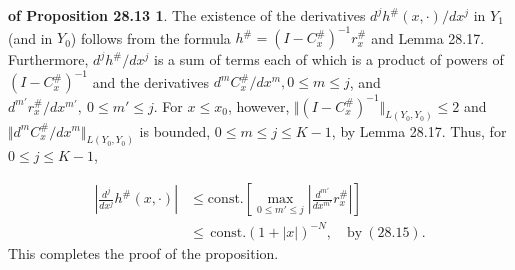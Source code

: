 \documentclass{surv-l}
\theoremstyle{plain}
\theoremstyle{definition}
\newtheorem*{pop2813}{\sc{Proof} of Proposition 28.13}
\numberwithin{equation}{chapter}
\begin{document}
\begin{pop2813}\label{pop28.13} The existence of the derivatives $d^{j}h^{\#}(x, \cdot)/dx^{j}$ in $Y_{1}$ (and in $Y_{0}$) follows from the formula $h^{\#} =(I-C_{x}^{\#})^{-1}r_{x}^{\#}$ and Lemma 28.17. Furthermore, $d^{j}h^{\#}/dx^{j}$ is a sum of terms each of which is a product of powers of $(I -C_{x}^{\#})^{-1}$ and the derivatives $d^{m}C_{x}^{\#}/dx^{m}, 0\leq m\leq j$, and $d^{m'}r_{x}^{\#}/dx^{m'},\ 0\leq m'\leq j$. For $x\leq x_{0}$, however, $\Vert(I-C_{x}^{\#})^{-1}\Vert_{L(Y_{0},Y_{0})}\leq 2$ and $\Vert d^{m}C_{x}^{\#}/dx^{m}\Vert_{L(Y_{0},Y_{0})}$ is bounded, $0\leq m\leq j\leq K-1$, by Lemma 28.17. Thus, for $0\leq j\leq K-1$,

\begin{align*}
\left|\frac{d^{j}}{dx^{j}}h^{\#}(x, \cdot)\right|&\leq \mathrm{const}. \left[\max_{0\leq m' \leq j}\left|\frac{d^{m'}}{dx^{m'}}r_{x}^{\#}\right|\right]\\
&\leq\,\mathrm{const.}(1+|x|)^{-N},\quad \mathrm{by}\ (28.15).
\end{align*}
This completes the proof of the proposition.
\end{pop2813}
\end{document}
